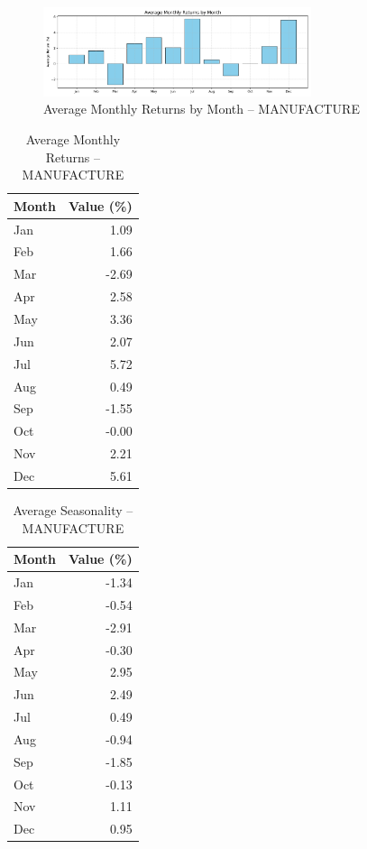 \documentclass[12pt]{article}
\begin{document}
\begin{figure}[h!]
    \centering
    \includegraphics[width=0.7\textwidth]{decomposition_outputs/MANUFACTURE_avg_monthly_returns.png}
    \caption{Average Monthly Returns by Month -- MANUFACTURE}
\end{figure}

\begin{table}[h!]
\centering
\caption{Average Monthly Returns -- MANUFACTURE}
\begin{tabular}{l r}
\toprule
Month & Value (\%) \\
\midrule
Jan & 1.09 \\
Feb & 1.66 \\
Mar & -2.69 \\
Apr & 2.58 \\
May & 3.36 \\
Jun & 2.07 \\
Jul & 5.72 \\
Aug & 0.49 \\
Sep & -1.55 \\
Oct & -0.00 \\
Nov & 2.21 \\
Dec & 5.61 \\
\bottomrule
\end{tabular}
\end{table}

\begin{table}[h!]
\centering
\caption{Average Seasonality -- MANUFACTURE}
\begin{tabular}{l r}
\toprule
Month & Value (\%) \\
\midrule
Jan & -1.34 \\
Feb & -0.54 \\
Mar & -2.91 \\
Apr & -0.30 \\
May & 2.95 \\
Jun & 2.49 \\
Jul & 0.49 \\
Aug & -0.94 \\
Sep & -1.85 \\
Oct & -0.13 \\
Nov & 1.11 \\
Dec & 0.95 \\
\bottomrule
\end{tabular}
\end{table}
\end{document}
